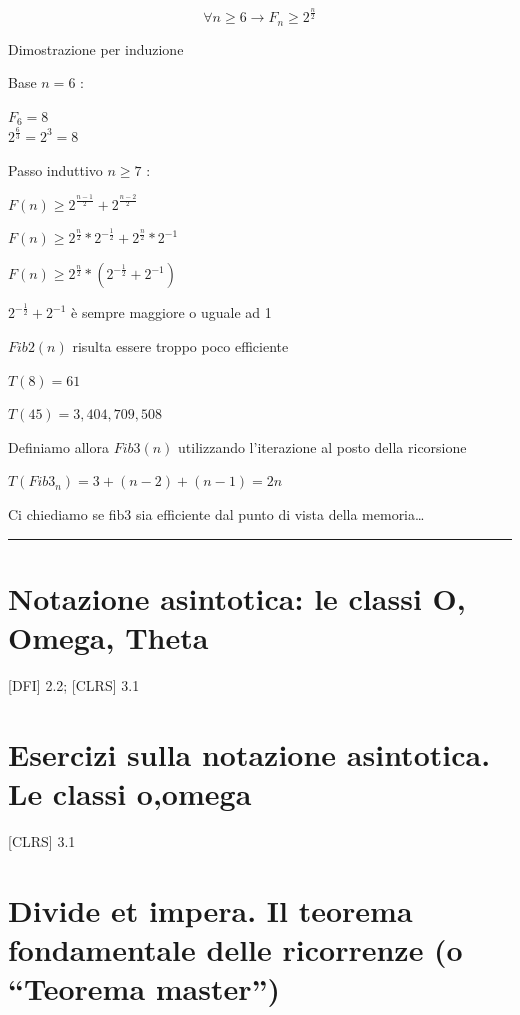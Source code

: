 \documentclass[tikz]{article}
\begin{document}
{{{\begin{equation}
\forall n \geq 6 \rightarrow F_n \geq 2^{\frac{n}{2}}
\end{equation}

{Dimostrazione per induzione}

{Base $n=6$ :}

$F_6=8$	\\
$2^{\frac{6}{3}}=2^3=8$

{Passo induttivo $n \geq 7$ :}

$F(n) \geq 2^{\frac{n-1}{2}} + 2^{\frac{n-2}{2}}$

$F(n) \geq 2^{\frac{n}{2}} * 2^{-\frac{1}{2}} + 2^{\frac{n}{2}} * 2^{-1} $

$F(n) \geq 2^{\frac{n}{2}} * ( 2^{-\frac{1}{2}} + 2^{-1} )$

{$2^{-\frac{1}{2}}+2^{-1}$ è sempre maggiore o uguale ad 1}

{$Fib2(n)$ risulta essere troppo poco efficiente}

$T(8)=61$

$T(45) = 3,404,709,508$

{Definiamo allora $Fib3(n)$ utilizzando l'iterazione al posto della ricorsione}



$T(Fib3_n)=3+(n-2)+(n-1)=2n$

{Ci chiediamo se fib3 sia efficiente dal punto di vista della
memoria\ldots{}}

\begin{center}\rule{0.5\linewidth}{\linethickness}\end{center}

\section{Notazione asintotica: le classi O, Omega, Theta}

{{[}DFI{]} 2.2; {[}CLRS{]} 3.1}

\section{Esercizi sulla notazione asintotica. Le classi o,omega}}

{{[}CLRS{]} 3.1}

\section{Divide et impera. Il teorema fondamentale delle ricorrenze (o ``Teorema master'')}

}}
\end{document}
